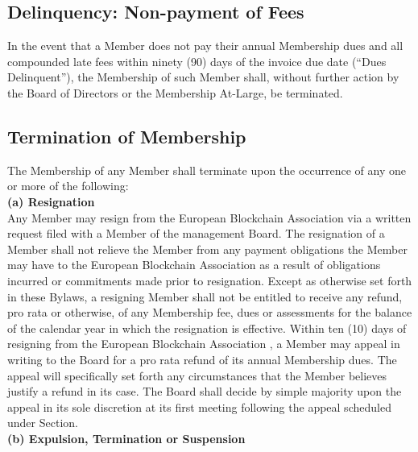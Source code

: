 \documentclass{article}
\begin{document}
\subsection{Delinquency: Non-payment of Fees}

In the event that a Member does not pay their annual Membership dues and all compounded late fees within ninety (90) days of the invoice due date (“Dues Delinquent”), the Membership of such Member shall, without further action by the Board of Directors or the Membership At-Large, be terminated.

\subsection{Termination of Membership}

The Membership of any Member shall terminate upon the occurrence of any one or more of the following: \\

\textbf{(a) Resignation} \\

Any Member may resign from the European Blockchain Association via a written request filed with a Member of the management Board. 
The resignation of a Member shall not relieve the Member from any payment obligations the Member may have to the European Blockchain Association as a result of obligations incurred or commitments made prior to resignation. 
Except as otherwise set forth in these Bylaws, a resigning Member shall not be entitled to receive any refund, pro rata or otherwise, of any Membership fee, dues or assessments for the balance of the calendar year in which the resignation is effective. 
Within ten (10) days of resigning from the European Blockchain Association , a Member may appeal in writing to the Board for a pro rata refund of its annual Membership dues. 
The appeal will specifically set forth any circumstances that the Member believes justify a refund in its case. 
The Board shall decide by simple majority upon the appeal in its sole discretion at its first meeting following the appeal scheduled under Section. \\

\textbf{(b) Expulsion, Termination or Suspension} \\
\end{document}
